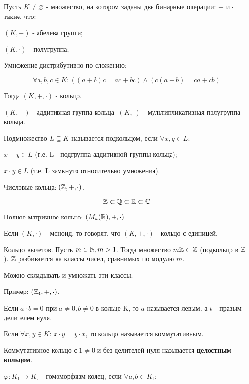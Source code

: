 \documentclass[../main.tex]{subfiles}
\begin{document}
 Пусть $K\neq \varnothing$ - множество, на котором заданы две бинарные операции: $+$ и $\cdot$
    такие, что:

    \void{} $(K, +)$ - абелева группа;

    \void{} $(K, \cdot)$ - полугруппа;

    \void{} Умножение дистрибутивно по сложению:

    $$\forall a,b,c \in K: ((a+b)c = ac + bc) \wedge (c(a + b) = ca + cb)$$

    Тогда $(K, +, \cdot)$ - кольцо.

    \void{} $(K, +)$ - аддитивная группа кольца, $(K, \cdot)$ - мультипликативная
    полугруппа кольца.

    \void{} Подмножество $L\subseteq K$ называется подкольцом, если $\forall x,y\in L$:

    \void{} $x - y\in L$ (т.е. L - подгруппа аддитивной группы кольца);

    \void{} $x\cdot y\in L$ (т.е. L замкнуто относительно умножения).

    \void{}

    \void{} Числовые кольца: $(\mathbb{Z}, +, \cdot)$.

    $$ \mathbb{Z} \subset \mathbb{Q} \subset \mathbb{R} \subset \mathbb{C} $$

    \void{} Полное матричное кольцо: $(M_n(\mathbb{R}), +, \cdot)$

    \void{} Если $(K, \cdot)$ - моноид, то говорят, что $(K, +, \cdot)$
    - кольцо с единицей.

    \void{} Кольцо вычетов. Пусть $m\in \mathbb{N}, m > 1$. Тогда множество $m\mathbb{Z}\subset \mathbb{Z}$
    (подкольцо в $\mathbb{Z}$). $\mathbb{Z}$ разбивается на классы чисел, сравнимых по модулю $m$.

    Можно складывать и умножать эти классы.

    Пример: $(\mathbb{Z}_4, +, \cdot)$.

    \void{} Если $a\cdot b = 0$ при $a\neq 0, b\neq 0$ в кольце K, то $a$
    называется левым, а $b$ - правым делителем нуля.

    \void{} Если $\forall x,y \in K$: $x\cdot y = y\cdot x$, то кольцо называется
    коммутативным.

    \void{} Коммутативное кольцо с $1\neq 0$ и без делителей нуля называется
    \textbf{целостным кольцом}.

    \void{} $\varphi: K_1\rightarrow K_2$ - гомоморфизм колец, если $\forall a,b\in K_1$:
\end{document}
